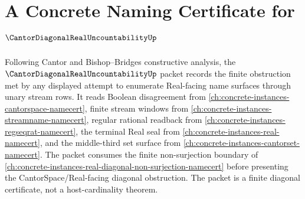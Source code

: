 \chapter{A Concrete Naming Certificate for $\CantorDiagonalRealUncountabilityUp$}
\label{ch:concrete-instances-cantor-diagonal-real-uncountability-namecert}

Following Cantor and Bishop--Bridges constructive analysis, the $\CantorDiagonalRealUncountabilityUp$ packet records the finite obstruction met by any displayed attempt to enumerate Real-facing name surfaces through unary stream rows. It reads Boolean disagreement from \autoref{ch:concrete-instances-cantorspace-namecert}, finite stream windows from \autoref{ch:concrete-instances-streamname-namecert}, regular rational readback from \autoref{ch:concrete-instances-regseqrat-namecert}, the terminal Real seal from \autoref{ch:concrete-instances-real-namecert}, and the middle-third set surface from \autoref{ch:concrete-instances-cantorset-namecert}. The packet consumes the finite non-surjection boundary of \autoref{ch:concrete-instances-real-diagonal-non-surjection-namecert} before presenting the CantorSpace/Real-facing diagonal obstruction. The packet is a finite diagonal certificate, not a host-cardinality theorem.

